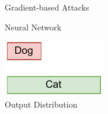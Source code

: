 \begin{frame}{Gradient-based Attacks}
\begin{minipage}{0.4\linewidth}
        Neural Network
    \end{minipage}\hfill
    \begin{minipage}{0.2\linewidth}
        \centering
        \includegraphics[width=\linewidth]{assets/correct_y_prob.pdf}\\
        Output Distribution
    \end{minipage}    
\end{frame}





